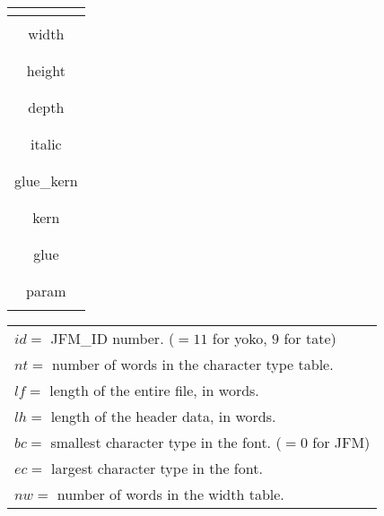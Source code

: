 \documentclass[twoside]{jarticle}
\begin{document}
{{\begin{table}[h]
\begin{minipage}[b]{2in}
\begin{tabular}{|c|c|}
\multicolumn{2}{|c|}{}\\ \hline
\multicolumn{2}{|c|}{}\\
\multicolumn{2}{|c|}{width} \\
\multicolumn{2}{|c|}{}\\ \hline
\multicolumn{2}{|c|}{}\\
\multicolumn{2}{|c|}{height} \\
\multicolumn{2}{|c|}{}\\ \hline
\multicolumn{2}{|c|}{}\\
\multicolumn{2}{|c|}{depth} \\
\multicolumn{2}{|c|}{}\\ \hline
\multicolumn{2}{|c|}{}\\
\multicolumn{2}{|c|}{italic} \\
\multicolumn{2}{|c|}{}\\ \hline
\multicolumn{2}{|c|}{}\\
\multicolumn{2}{|c|}{glue\_kern} \\
\multicolumn{2}{|c|}{}\\ \hline
\multicolumn{2}{|c|}{}\\
\multicolumn{2}{|c|}{kern} \\
\multicolumn{2}{|c|}{}\\ \hline
\multicolumn{2}{|c|}{}\\
\multicolumn{2}{|c|}{glue} \\
\multicolumn{2}{|c|}{}\\ \hline
\multicolumn{2}{|c|}{}\\
\multicolumn{2}{|c|}{param} \\
\multicolumn{2}{|c|}{}\\ \hline
\end{tabular}
\end{minipage}
\begin{minipage}[b]{3.3in}
\noindent
\begin{tabular}{l}
$id=$ JFM\_ID number. ($=11$ for yoko, $9$ for tate) \\
$nt=$ number of words in the character type table. \\
$lf=$ length of the entire file, in words. \\
$lh=$ length of the header data, in words. \\
$bc=$ smallest character type in the font. ($=0$ for JFM) \\
$ec=$ largest character type in the font. \\
$nw=$ number of words in the width table. \\

\end{tabular}
\end{minipage}
\end{table}}}
\end{document}
